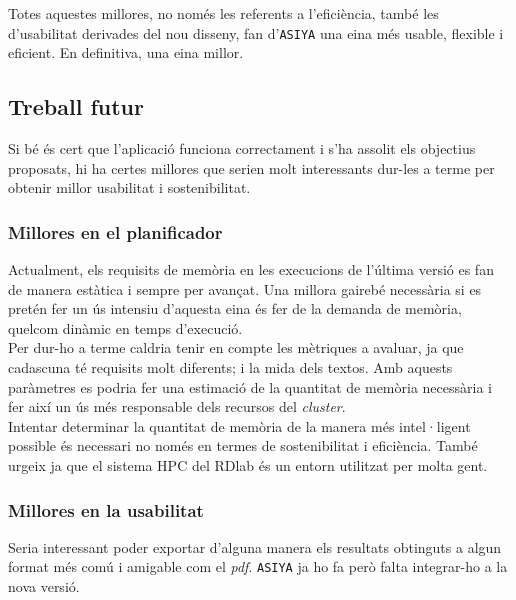 \documentclass[11pt,a4paper]{article}
\begin{document}
Totes aquestes millores, no només les referents a l'eficiència, també les d'usabilitat derivades del nou disseny, fan d'\texttt{ASIYA} una eina més usable, flexible i eficient. En definitiva, una eina millor.
\\

\subsection{Treball futur}

Si bé és cert que l'aplicació funciona correctament i s'ha assolit els objectius proposats, hi ha certes millores que serien molt interessants dur-les a terme per obtenir millor usabilitat i sostenibilitat.


\subsubsection{Millores en el planificador}

Actualment, els requisits de memòria en les execucions de l'última versió es fan de manera estàtica i sempre per avançat. Una millora gairebé necessària si es pretén fer un ús intensiu d'aquesta eina és fer de la demanda de memòria, quelcom dinàmic en temps d'execució. 
\\

Per dur-ho a terme caldria tenir en compte les mètriques a avaluar, ja que cadascuna té requisits molt diferents; i la mida dels textos.  Amb aquests paràmetres es podria fer una estimació de la quantitat de memòria necessària i fer així un ús més responsable dels recursos del \textit{cluster}.
\\

Intentar determinar la quantitat de memòria de la manera més intel·ligent possible és necessari no només en termes de sostenibilitat i eficiència. També urgeix ja que el sistema HPC del RDlab és un entorn utilitzat per molta gent.

\subsubsection{Millores en la usabilitat}

Seria interessant poder exportar d'alguna manera els resultats obtinguts a algun format més comú i amigable com el \textit{pdf}. \texttt{ASIYA} ja ho fa però falta integrar-ho a la nova versió.
\end{document}

